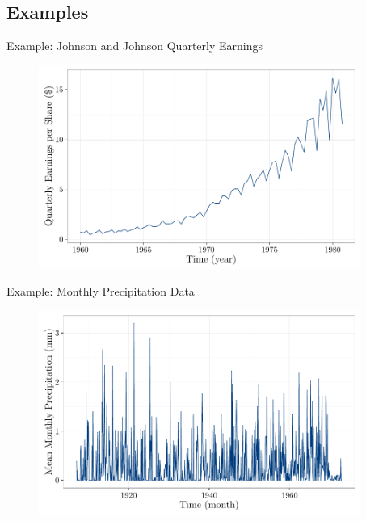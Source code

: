 \documentclass[envcountsect,usenames,dvipsnames]{beamer}
\theoremstyle{mystyle}
\begin{document}
\subsection{Examples}

\begin{frame}{Example: Johnson and Johnson Quarterly Earnings}
	
	\begin{figure}
	    \centering
	  \includegraphics[width = 10.5cm]{Images/JJ}
	\end{figure}
	
\end{frame}

\begin{frame}{Example: Monthly Precipitation Data}
	
	\begin{figure}
	    \centering
	  \includegraphics[width = 10.5cm]{Images/precip}
	\end{figure}	
	
\end{frame}
\end{document}
